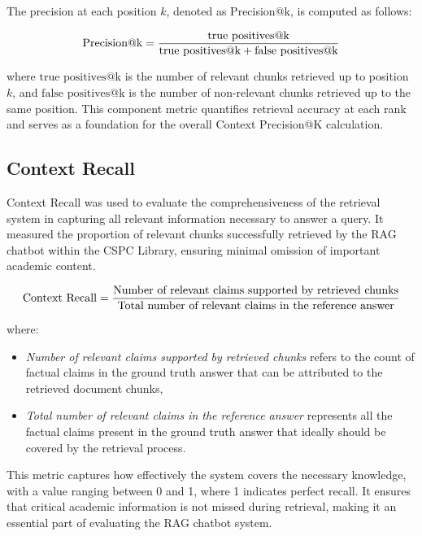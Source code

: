 \begin{refsection}
The precision at each position $k$, denoted as Precision@k, is computed as follows:

\begin{equation}
\centering
\text{Precision@k} = 
\frac{
    \text{true positives@k}
}{
    \text{true positives@k} + \text{false positives@k}
}
\end{equation}

where $\text{true positives@k}$ is the number of relevant chunks retrieved up to position $k$, and $\text{false positives@k}$ is the number of non-relevant chunks retrieved up to the same position. This component metric quantifies retrieval accuracy at each rank and serves as a foundation for the overall Context Precision@K calculation.

\subsection*{Context Recall}

Context Recall was used to evaluate the comprehensiveness of the retrieval system in capturing all relevant information necessary to answer a query. It measured the proportion of relevant chunks successfully retrieved by the RAG chatbot within the CSPC Library, ensuring minimal omission of important academic content.

\begin{equation}
\centering
\text{Context Recall} = \frac{\text{Number of relevant claims supported by retrieved chunks}}{\text{Total number of relevant claims in the reference answer}}
\end{equation}

where:

\begin{itemize}
    \item \textit{Number of relevant claims supported by retrieved chunks} refers to the count of factual claims in the ground truth answer that can be attributed to the retrieved document chunks,
    \item \textit{Total number of relevant claims in the reference answer} represents all the factual claims present in the ground truth answer that ideally should be covered by the retrieval process.
\end{itemize}

This metric captures how effectively the system covers the necessary knowledge, with a value ranging between 0 and 1, where 1 indicates perfect recall. It ensures that critical academic information is not missed during retrieval, making it an essential part of evaluating the RAG chatbot system.



\end{refsection}
